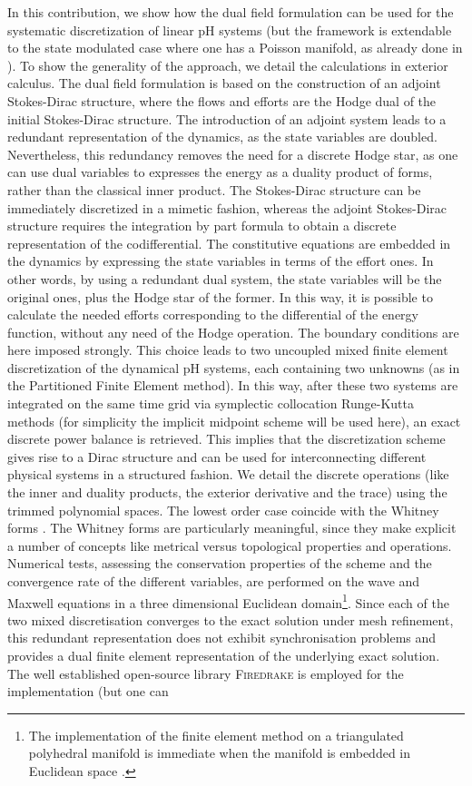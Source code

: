 \documentclass{elsarticle}
\newcommand{\firedrake}{\textsc{Firedrake}\xspace}
\begin{document}
In this contribution, we show how the dual field formulation can be used for the systematic discretization of linear pH systems (but the framework is extendable to the state modulated case where one has a Poisson manifold, as already done in \cite{zhang2021mass}). To show the generality of the approach, we detail the calculations in exterior calculus. The dual field formulation is based on the construction of an adjoint Stokes-Dirac structure, where the flows and efforts are the Hodge dual of the initial Stokes-Dirac structure. The introduction of an adjoint system leads to a redundant representation of the dynamics, as the state variables are doubled. Nevertheless, this redundancy removes the need for a discrete Hodge star, as one can use dual variables to expresses the energy as a duality product of forms, rather than the classical inner product. The Stokes-Dirac structure can be immediately discretized in a mimetic fashion, whereas the adjoint Stokes-Dirac structure requires the integration by part formula to obtain a discrete representation of the codifferential. The constitutive equations are embedded in the dynamics by expressing the state variables in terms of the effort ones. In other words, by using a redundant dual system, the state variables will be the original ones, plus the Hodge star of the former. In this way, it is possible to calculate the needed efforts corresponding to the differential of the energy function, without any need of the Hodge operation. The boundary conditions are here imposed strongly. This choice leads to two uncoupled mixed finite element discretization of the dynamical pH systems, each containing two unknowns (as in the Partitioned Finite Element method).  In this way, after these two systems are integrated on the same time grid via symplectic collocation Runge-Kutta methods (for simplicity the implicit midpoint scheme will be used here), an exact discrete power balance is retrieved. This implies that the discretization scheme gives rise to a Dirac structure and can be used for interconnecting different physical systems in a structured fashion. We detail the discrete operations (like the inner and duality products, the exterior derivative and the trace) using the trimmed polynomial spaces. The lowest order case coincide with the Whitney forms \cite{whitney1957}. The Whitney forms are particularly meaningful, since they make explicit a number of concepts  like metrical versus topological properties and operations. Numerical tests, assessing the conservation properties of the scheme and the convergence rate of the different variables, are performed on the wave and Maxwell equations in a three dimensional Euclidean domain\footnote{The implementation of the finite element method on a triangulated polyhedral manifold is immediate when the manifold is embedded in Euclidean space \cite{arnold2018finite}.}. Since each of the two mixed discretisation converges to the exact solution under mesh refinement, this redundant representation does not exhibit synchronisation problems and provides a dual finite element representation of the underlying exact solution. The well established open-source library \firedrake \cite{rathgeber2017firedrake} is employed for the implementation (but one can 
\end{document}
